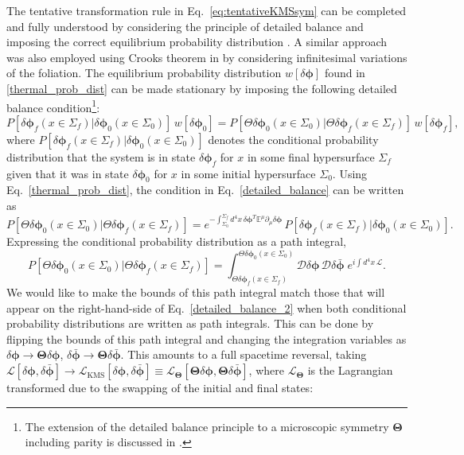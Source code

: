\documentclass[aps,prd,nofootinbib,amsmath,amssymb,showpacs,longbibliography,singlecolumn,superscriptaddress,notitlepage]{revtex4-1}
\theoremstyle{plain}
\theoremstyle{definition}
\newcommand{\cvec}[1]{\ensuremath{\bm {#1}}}
\newcommand{\cmat}[1]{\ensuremath{\mathds{{#1}}}}
\begin{document}
The tentative transformation rule in Eq.~\eqref{eq:tentativeKMSsym} can be completed and fully understood by considering the principle of detailed balance and imposing the correct equilibrium probability distribution  \cite{Guo:2022ixk}.
A similar approach was also employed using Crooks theorem in \cite{Torrieri:2020ezm} by considering infinitesimal variations of the foliation.
The equilibrium probability distribution $w[\delta \cvec{\phi}]$ found in  \eqref{thermal_prob_dist} can be made stationary by imposing the following detailed balance condition\footnote{The extension of the detailed balance principle to a microscopic symmetry $\bm\Theta$ including parity is discussed in \cite{LIFSHITZ19811}.}:
\begin{equation} \label{detailed_balance}
    P[\delta \cvec{\phi}_f(x \in \Sigma_f) | \delta \cvec{\phi}_0(x \in \Sigma_0)] \,w[\delta \cvec{\phi}_0] = P[ \Theta \delta \cvec{\phi}_0(x \in \Sigma_0) | \Theta \delta \cvec{\phi}_f(x \in \Sigma_f)]\, w[\delta \cvec{\phi}_f] ,
\end{equation}
where $P[\delta \cvec{\phi}_f(x \in \Sigma_f) | \delta \cvec{\phi}_0(x \in \Sigma_0)]$ denotes the conditional probability distribution that the system is in state $\delta \cvec{\phi}_f$ for $x$ in some final hypersurface $\Sigma_f$ given that it was in state $\delta \cvec{\phi}_0$ for $x$ in some initial hypersurface $\Sigma_0$. 
Using Eq.\ \eqref{thermal_prob_dist}, the condition in Eq.~\eqref{detailed_balance} can be written as 
\begin{equation} \label{detailed_balance_2}
    P[\Theta \delta \cvec{\phi}_0(x \in \Sigma_0) | \Theta \delta \cvec{\phi}_f(x \in \Sigma_f)] = e^{- \int_{\Sigma_0}^{\Sigma_f} d^4x\, \delta \cvec{\phi}^T \cmat{E}^{\mu} \partial_{\mu} \delta \cvec{\phi}}\, P[\delta \cvec{\phi}_f(x \in \Sigma_f) | \delta \cvec{\phi}_0(x \in \Sigma_0)] .
\end{equation}
Expressing the conditional probability distribution as a path integral,
\begin{equation}
    P[\Theta \delta \cvec{\phi}_0(x \in \Sigma_0) | \Theta \delta \cvec{\phi}_f(x \in \Sigma_f)] = \int_{\Theta\delta \cvec{\phi}_f(x \in \Sigma_f)
    }
    ^{\Theta\delta \cvec{\phi}_0(x \in \Sigma_0) 
    } 
    \mathcal{D} \delta \cvec{\phi}\, \mathcal{D}  \delta \bar{\cvec{\phi}} \; e^{i \int d^4x \,\mathcal{L}} .
\end{equation}
We would like to make the bounds of this path integral match those that will appear on the right-hand-side of Eq.\ \eqref{detailed_balance_2} when both conditional probability distributions are written as path integrals. This can be done by flipping the bounds of this path integral and changing the integration variables as $\delta\cvec{\phi} \to {\bm\Theta}\delta\cvec{\phi}$,  $\delta\bar{\cvec{\phi}} \to {\bm\Theta}\delta\bar{\cvec{\phi}}$. This amounts to a full spacetime reversal, taking $\mathcal{L}[\delta\cvec{\phi},\delta\bar{\cvec{\phi}}] \to \mathcal{L}_{\mathrm{KMS}} [\delta\cvec{\phi},\delta\bar{\cvec{\phi}}] \equiv \mathcal{L}_{\bm\Theta}[{\bm\Theta}\delta\cvec{\phi},{\bm\Theta}\delta\bar{\cvec{\phi}}]$, where $\mathcal{L}_{\bm\Theta}$ is the Lagrangian transformed due to the swapping of the initial and final states:
\end{document}

